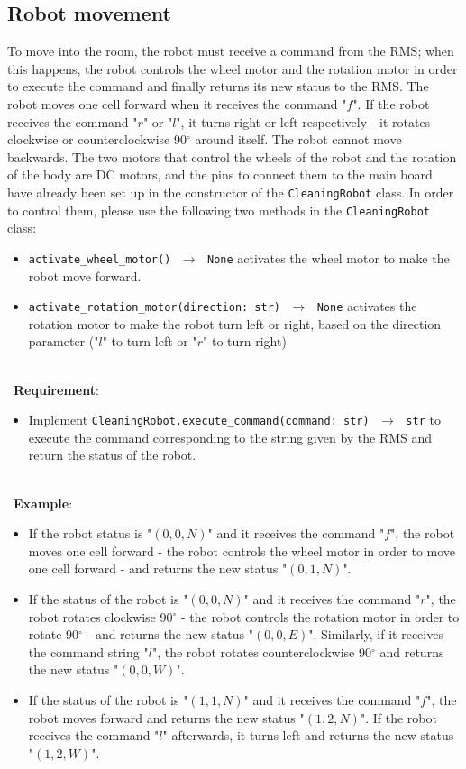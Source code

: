 \subsection{Robot movement}
To move into the room, the robot must receive a command from the RMS; when this happens, the robot controls the wheel motor and the rotation motor in order to execute the command and finally returns its new status to the RMS.
The robot moves one cell forward when it receives the command "$f$". If the robot receives the command "$r$" or "$l$", it turns right or left respectively - \ie it rotates clockwise or counterclockwise 90$^{\circ}$ around itself. The robot cannot move backwards.
The two motors that control the wheels of the robot and the rotation of the body are DC motors, and the pins to connect them to the main board have already been set up in the constructor of the \texttt{CleaningRobot} class.
In order to control them, please use the following two methods in the \texttt{CleaningRobot} class:
\begin{itemize}
    \item \texttt{activate\_wheel\_motor() $\,\to\,$ None}  activates the wheel motor to make the robot move forward.
    \item \texttt{activate\_rotation\_motor(direction: str) $\,\to\,$ None} activates the rotation motor to make the robot turn left or right, based on the direction parameter ("$l$" to turn left or "$r$" to turn right)
\end{itemize}

\ \\ \
\noindent\textbf{Requirement}:
\begin{itemize}
    \item Implement \texttt{CleaningRobot.execute\_command(command: str) $\,\to\,$ str} to execute the command corresponding to the string given by the RMS and return the status of the robot.
\end{itemize}

\ \\ \
\noindent\textbf{Example}:
\begin{itemize}
    \item If the robot status is "$(0,0,N)$" and it receives the command "$f$", the robot moves one cell forward - \ie the robot controls the wheel motor in order to move one cell forward - and returns the new status "$(0,1,N)$". 
    \item If the status of the robot is "$(0,0,N)$" and it receives the command "$r$", the robot rotates clockwise 90$^{\circ}$ - \ie the robot controls the rotation motor in order to rotate 90$^{\circ}$ - and returns the new status "$(0,0,E)$". Similarly, if it receives the command string "$l$", the robot rotates counterclockwise 90$^{\circ}$ and returns the new status "$(0,0,W)$".
    \item If the  status of the robot is "$(1,1,N)$" and it receives the command "$f$", the robot moves forward and returns the new status "$(1,2,N)$". If the robot receives the command "$l$" afterwards, it turns left and returns the new status "$(1,2,W)$".
\end{itemize}

